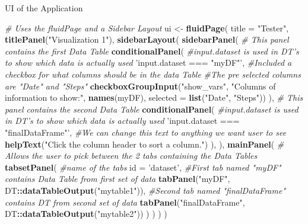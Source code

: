 \documentclass[]{book}
\newenvironment{Shaded}{\begin{snugshade}}{\end{snugshade}}
\newcommand{\KeywordTok}[1]{\textcolor[rgb]{0.13,0.29,0.53}{\textbf{#1}}}
\newcommand{\DataTypeTok}[1]{\textcolor[rgb]{0.13,0.29,0.53}{#1}}
\newcommand{\StringTok}[1]{\textcolor[rgb]{0.31,0.60,0.02}{#1}}
\newcommand{\CommentTok}[1]{\textcolor[rgb]{0.56,0.35,0.01}{\textit{#1}}}
\newcommand{\OperatorTok}[1]{\textcolor[rgb]{0.81,0.36,0.00}{\textbf{#1}}}
\newcommand{\NormalTok}[1]{#1}
\begin{document}
UI of the Application

\begin{Shaded}
\begin{Highlighting}[]
\CommentTok{# Uses the fluidPage and a Sidebar Layout}
\NormalTok{ui <-}\StringTok{ }\KeywordTok{fluidPage}\NormalTok{(}
  \DataTypeTok{title =} \StringTok{"Tester"}\NormalTok{,}
  \KeywordTok{titlePanel}\NormalTok{(}\StringTok{"Visualization 1"}\NormalTok{),}
  \KeywordTok{sidebarLayout}\NormalTok{(}
    \KeywordTok{sidebarPanel}\NormalTok{(}
      \CommentTok{# This panel contains the first Data Table}
      \KeywordTok{conditionalPanel}\NormalTok{(}
        \CommentTok{#input.dataset is used in DT's to show which data is actually used}
        \StringTok{'input.dataset === "myDF"'}\NormalTok{,}
        \CommentTok{#Included a checkbox for what columns should be in the data Table}
        \CommentTok{#The pre selected columns are "Date" and "Steps"}
        \KeywordTok{checkboxGroupInput}\NormalTok{(}\StringTok{"show_vars"}\NormalTok{, }\StringTok{"Columns of information to show:"}\NormalTok{,}
                           \KeywordTok{names}\NormalTok{(myDF), }\DataTypeTok{selected =} \KeywordTok{list}\NormalTok{(}\StringTok{"Date"}\NormalTok{, }\StringTok{"Steps"}\NormalTok{))}
\NormalTok{      ),}
      \CommentTok{# This panel contains the second Data Table}
      \KeywordTok{conditionalPanel}\NormalTok{(}
        \CommentTok{#input.dataset is used in DT's to show which data is actually used}
        \StringTok{'input.dataset === "finalDataFrame"'}\NormalTok{,}
        \CommentTok{#We can change this text to anything we want user to see}
        \KeywordTok{helpText}\NormalTok{(}\StringTok{"Click the column header to sort a column."}\NormalTok{)}
\NormalTok{      ),}
\NormalTok{    ),}
    \KeywordTok{mainPanel}\NormalTok{(}
      \CommentTok{# Allows the user to pick between the 2 tabs containing the Data Tables}
      \KeywordTok{tabsetPanel}\NormalTok{(}
        \CommentTok{#name of the tabs}
        \DataTypeTok{id =} \StringTok{'dataset'}\NormalTok{,}
        \CommentTok{#First tab named "myDF" contains Data Table from first set of data}
        \KeywordTok{tabPanel}\NormalTok{(}\StringTok{"myDF"}\NormalTok{, DT}\OperatorTok{::}\KeywordTok{dataTableOutput}\NormalTok{(}\StringTok{"mytable1"}\NormalTok{)),}
        \CommentTok{#Second tab named "finalDataFrame" contains DT from second set of data}
        \KeywordTok{tabPanel}\NormalTok{(}\StringTok{"finalDataFrame"}\NormalTok{, DT}\OperatorTok{::}\KeywordTok{dataTableOutput}\NormalTok{(}\StringTok{"mytable2"}\NormalTok{))}
\NormalTok{      )}
\NormalTok{    )}
\NormalTok{  )}
\NormalTok{)}
\end{Highlighting}
\end{Shaded}
\end{document}
